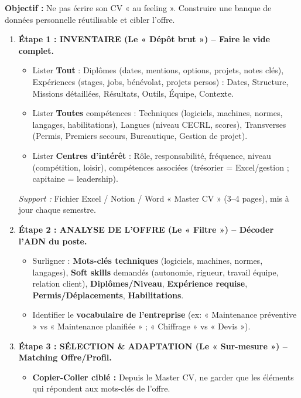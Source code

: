 \documentclass[11pt]{article}
\newcommand{\cle}[1]{{\popxbold\color{popdark}#1}}
\begin{document}
\begin{methode}
    \textbf{Objectif :} Ne pas écrire son CV « au feeling ». Construire une \cle{banque de données personnelle} réutilisable et cibler l'offre.
    \begin{enumerate}
        \item \textbf{Étape 1 : INVENTAIRE (Le « Dépôt brut ») -- Faire le vide complet.}
              \begin{itemize}
                  \item Lister \textbf{Tout} : Diplômes (dates, mentions, options, projets, notes clés), Expériences (stages, jobs, bénévolat, projets persos) : Dates, Structure, Missions détaillées, Résultats, Outils, Équipe, Contexte.
                  \item Lister \textbf{Toutes} compétences : Techniques (logiciels, machines, normes, langages, habilitations), Langues (niveau CECRL, scores), Transverses (Permis, Premiers secours, Bureautique, Gestion de projet).
                  \item Lister \textbf{Centres d'intérêt} : Rôle, responsabilité, fréquence, niveau (compétition, loisir), compétences associées (trésorier = Excel/gestion ; capitaine = leadership).
              \end{itemize}
              \textit{Support :} Fichier Excel / Notion / Word « Master CV » (3--4 pages), mis à jour chaque semestre.
        \item \textbf{Étape 2 : ANALYSE DE L'OFFRE (Le « Filtre ») -- Décoder l'ADN du poste.}
              \begin{itemize}
                  \item Surligner : \textbf{Mots-clés techniques} (logiciels, machines, normes, langages), \textbf{Soft skills} demandés (autonomie, rigueur, travail équipe, relation client), \textbf{Diplômes/Niveau}, \textbf{Expérience requise}, \textbf{Permis/Déplacements}, \textbf{Habilitations}.
                  \item Identifier le \textbf{vocabulaire de l'entreprise} (ex: « Maintenance préventive » vs « Maintenance planifiée » ; « Chiffrage » vs « Devis »).
              \end{itemize}
        \item \textbf{Étape 3 : SÉLECTION \& ADAPTATION (Le « Sur-mesure ») -- Matching Offre/Profil.}
              \begin{itemize}
                  \item \textbf{Copier-Coller ciblé :} Depuis le Master CV, ne garder que les éléments qui répondent aux mots-clés de l'offre.

\end{itemize}
\end{enumerate}
\end{methode}
\end{document}
